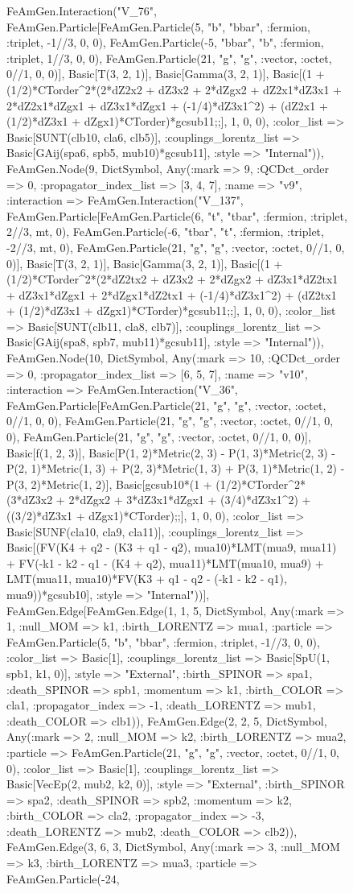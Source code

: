 \documentclass{revtex4}
\begin{document}
\begin{figure}[!htb]
\begin{center}
{FeAmGen.Interaction("V_76", FeAmGen.Particle[FeAmGen.Particle(5, "b", "bbar", :fermion, :triplet, -1//3, 0, 0), FeAmGen.Particle(-5, "bbar", "b", :fermion, :triplet, 1//3, 0, 0), FeAmGen.Particle(21, "g", "g", :vector, :octet, 0//1, 0, 0)], Basic[T(3, 2, 1)], Basic[Gamma(3, 2, 1)], Basic[(1 + (1/2)*CTorder^2*(2*dZ2x2 + dZ3x2 + 2*dZgx2 + dZ2x1*dZ3x1 + 2*dZ2x1*dZgx1 + dZ3x1*dZgx1 + (-1/4)*dZ3x1^2) + (dZ2x1 + (1/2)*dZ3x1 + dZgx1)*CTorder)*gcsub11;;], 1, 0, 0), :color_list => Basic[SUNT(clb10, cla6, clb5)], :couplings_lorentz_list => Basic[GAij(spa6, spb5, mub10)*gcsub11], :style => "Internal")), FeAmGen.Node(9, Dict{Symbol, Any}(:mark => 9, :QCDct_order => 0, :propagator_index_list => [3, 4, 7], :name => "v9", :interaction => FeAmGen.Interaction("V_137", FeAmGen.Particle[FeAmGen.Particle(6, "t", "tbar", :fermion, :triplet, 2//3, mt, 0), FeAmGen.Particle(-6, "tbar", "t", :fermion, :triplet, -2//3, mt, 0), FeAmGen.Particle(21, "g", "g", :vector, :octet, 0//1, 0, 0)], Basic[T(3, 2, 1)], Basic[Gamma(3, 2, 1)], Basic[(1 + (1/2)*CTorder^2*(2*dZ2tx2 + dZ3x2 + 2*dZgx2 + dZ3x1*dZ2tx1 + dZ3x1*dZgx1 + 2*dZgx1*dZ2tx1 + (-1/4)*dZ3x1^2) + (dZ2tx1 + (1/2)*dZ3x1 + dZgx1)*CTorder)*gcsub11;;], 1, 0, 0), :color_list => Basic[SUNT(clb11, cla8, clb7)], :couplings_lorentz_list => Basic[GAij(spa8, spb7, mub11)*gcsub11], :style => "Internal")), FeAmGen.Node(10, Dict{Symbol, Any}(:mark => 10, :QCDct_order => 0, :propagator_index_list => [6, 5, 7], :name => "v10", :interaction => FeAmGen.Interaction("V_36", FeAmGen.Particle[FeAmGen.Particle(21, "g", "g", :vector, :octet, 0//1, 0, 0), FeAmGen.Particle(21, "g", "g", :vector, :octet, 0//1, 0, 0), FeAmGen.Particle(21, "g", "g", :vector, :octet, 0//1, 0, 0)], Basic[f(1, 2, 3)], Basic[P(1, 2)*Metric(2, 3) - P(1, 3)*Metric(2, 3) - P(2, 1)*Metric(1, 3) + P(2, 3)*Metric(1, 3) + P(3, 1)*Metric(1, 2) - P(3, 2)*Metric(1, 2)], Basic[gcsub10*(1 + (1/2)*CTorder^2*(3*dZ3x2 + 2*dZgx2 + 3*dZ3x1*dZgx1 + (3/4)*dZ3x1^2) + ((3/2)*dZ3x1 + dZgx1)*CTorder);;], 1, 0, 0), :color_list => Basic[SUNF(cla10, cla9, cla11)], :couplings_lorentz_list => Basic[(FV(K4 + q2 - (K3 + q1 - q2), mua10)*LMT(mua9, mua11) + FV(-k1 - k2 - q1 - (K4 + q2), mua11)*LMT(mua10, mua9) + LMT(mua11, mua10)*FV(K3 + q1 - q2 - (-k1 - k2 - q1), mua9))*gcsub10], :style => "Internal"))], FeAmGen.Edge[FeAmGen.Edge(1, 1, 5, Dict{Symbol, Any}(:mark => 1, :null_MOM => k1, :birth_LORENTZ => mua1, :particle => FeAmGen.Particle(5, "b", "bbar", :fermion, :triplet, -1//3, 0, 0), :color_list => Basic[1], :couplings_lorentz_list => Basic[SpU(1, spb1, k1, 0)], :style => "External", :birth_SPINOR => spa1, :death_SPINOR => spb1, :momentum => k1, :birth_COLOR => cla1, :propagator_index => -1, :death_LORENTZ => mub1, :death_COLOR => clb1)), FeAmGen.Edge(2, 2, 5, Dict{Symbol, Any}(:mark => 2, :null_MOM => k2, :birth_LORENTZ => mua2, :particle => FeAmGen.Particle(21, "g", "g", :vector, :octet, 0//1, 0, 0), :color_list => Basic[1], :couplings_lorentz_list => Basic[VecEp(2, mub2, k2, 0)], :style => "External", :birth_SPINOR => spa2, :death_SPINOR => spb2, :momentum => k2, :birth_COLOR => cla2, :propagator_index => -3, :death_LORENTZ => mub2, :death_COLOR => clb2)), FeAmGen.Edge(3, 6, 3, Dict{Symbol, Any}(:mark => 3, :null_MOM => k3, :birth_LORENTZ => mua3, :particle => FeAmGen.Particle(-24, }
\end{center}
\end{figure}
\end{document}
